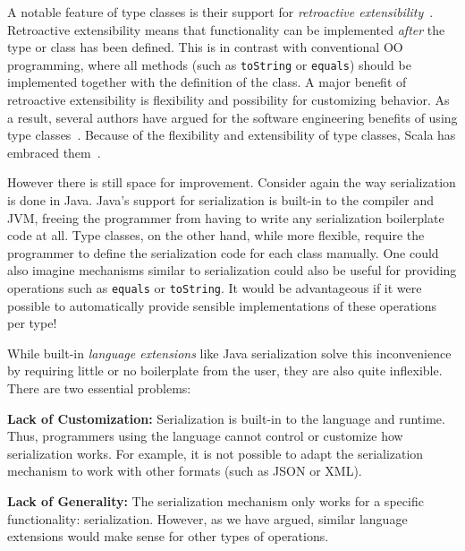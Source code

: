 \documentclass[preprint,nocopyrightspace]{sigplanconf}
\begin{document}
A notable feature of type classes is their support for
\emph{retroactive extensibility}~\cite{RetroactiveExtensibility}.
Retroactive extensibility means that functionality can be implemented
\emph{after} the type or class has been defined. This is in contrast
with conventional OO programming, where all methods (such as
\lstinline{toString} or \lstinline{equals}) should be implemented
together with the definition of the class. A major benefit of
retroactive extensibility is flexibility and possibility for
customizing behavior. As a result, several authors have argued for the
software engineering benefits of using type
classes~\cite{RetroactiveExtensibility,Oliveira2010}.
Because of the flexibility and extensibility of type classes, Scala has
embraced them~\cite{Oliveira2010,ScalaCollections,Pickling}.


However there is still space for improvement. Consider again the way
serialization is done in Java. Java's support
for serialization is built-in to the compiler and JVM, freeing the
programmer from having to write any serialization boilerplate code at all.
Type classes, on the other hand, while more flexible, require the programmer
to define the serialization code for each class manually.
One could also imagine mechanisms similar to serialization could also be useful for
providing operations such as \lstinline{equals} or
\lstinline{toString}. It would be advantageous
if it were possible to automatically provide sensible implementations
of these operations per type!


While built-in \emph{language extensions} like Java
serialization solve this inconvenience by requiring
little or no boilerplate from the user, they are also quite
inflexible. There are two essential problems:

\begin{itemize*}
\item {\bf Lack of Customization:} Serialization
  is built-in to the language and runtime. Thus, programmers using the
  language cannot control or customize how serialization works. For
  example, it is not possible to adapt the serialization mechanism to
  work with other formats (such as JSON or XML).
\item {\bf Lack of Generality:} The serialization mechanism only
  works for a specific functionality: serialization. However, as we
  have argued, similar language extensions would make sense for other types
  of operations.
\end{itemize*}
\end{document}
